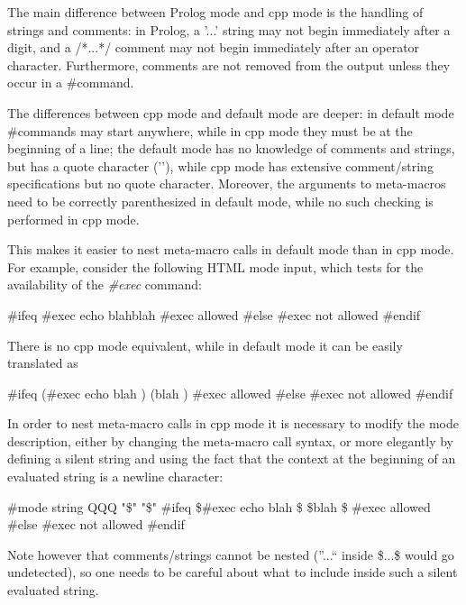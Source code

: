 The main difference between Prolog mode and cpp mode is the handling of
strings and comments: in Prolog, a '...' string may not begin immediately
after a digit, and a /*...*/ comment may not begin immediately after an
operator character. Furthermore, comments are not removed from the output
unless they occur in a \#command. 

The differences between cpp mode and default mode are deeper: in default mode
\#commands may start anywhere, while in cpp mode they must be at the beginning
of a line; the default mode has no knowledge of comments and strings, but has
a quote character ('{\htmlBackslash}'), while cpp mode has extensive
comment/string specifications but no quote character. Moreover, the arguments
to meta-macros need to be correctly parenthesized in default mode, while no
such checking is performed in cpp mode. 

This makes it easier to nest meta-macro calls in default mode than in cpp
mode. For example, consider the following HTML mode input, which tests for the
availability of the {\it \#exec} command: 

\begin{PRE}
  {\htmlLt}\#ifeq {\htmlLt}\#exec echo blah{\htmlGt}{\htmlBar}blah
  {\htmlGt} \#exec allowed {\htmlLt}\#else{\htmlGt} \#exec not allowed {\htmlLt}\#endif{\htmlGt}
\end{PRE}

There is no cpp mode equivalent, while in default mode it can be easily
translated as 

\begin{PRE}
  \#ifeq (\#exec echo blah
  ) (blah
  )
  {\htmlBackslash}\#exec allowed
  \#else
  {\htmlBackslash}\#exec not allowed
  \#endif
\end{PRE}

In order to nest meta-macro calls in cpp mode it is necessary to modify the
mode description, either by changing the meta-macro call syntax, or more
elegantly by defining a silent string and using the fact that the context at
the beginning of an evaluated string is a newline character: 

\begin{PRE}
  \#mode string QQQ "\$" "\$"
  \#ifeq \$\#exec echo blah
  \$ \$blah
  \$
  {\htmlBackslash}\#exec allowed
  \#else
  {\htmlBackslash}\#exec not allowed
  \#endif
\end{PRE}

Note however that comments/strings cannot be nested (''...`` inside \$...\$
would go undetected), so one needs to be careful about what to include inside
such a silent evaluated string. 

